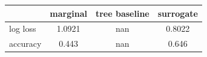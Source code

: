 \begin{tabular}{lccc}
\toprule
 & marginal & tree baseline & surrogate \\
\midrule
log loss & 1.0921 & nan & 0.8022 \\
accuracy & 0.443 & nan & 0.646 \\
\bottomrule
\end{tabular}
